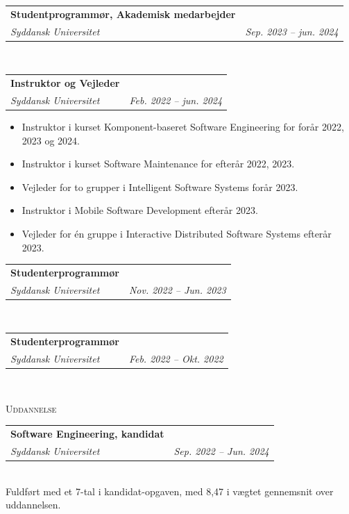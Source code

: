 \documentclass[11pt]{article}
\makeatletter
\newcommand{\resumeSubheading}[4]{
  \noindent\begin{tabular*}{0.98\textwidth}[t]{l@{\extracolsep{\fill}}r}
    \noindent \textbf{#3} & \textit{\small #2} \\ \vspace{-3pt} 
    \noindent \textit{\small #1} & \textit{\small #4} 
  \end{tabular*}\vspace{7pt}
}
\makeatother
\begin{document}
\resumeSubheading{Syddansk Universitet}{}{Studentprogrammør, Akademisk
medarbejder}{Sep. 2023 -- jun. 2024}\\

\vspace{0.3cm}
\resumeSubheading{Syddansk Universitet}{}{Instruktor og Vejleder}{Feb. 2022 -- jun. 2024}
\vspace{-0.2cm}
\begin{itemize}[itemsep=0pt]
  \small
  \item Instruktor i kurset Komponent-baseret Software Engineering for forår 2022, 2023 og 2024.
  \item Instruktor i kurset Software Maintenance for efterår 2022, 2023. 
  \item Vejleder for to grupper i Intelligent Software Systems forår 2023. 
  \item Instruktor i Mobile Software Development efterår 2023.  
  \item Vejleder for én gruppe i Interactive Distributed Software Systems efterår 2023.
\end{itemize}


\vspace{0.3cm}
\resumeSubheading{Syddansk Universitet}{}{Studenterprogrammør}{Nov. 2022 -- Jun. 2023}\\

\vspace{0.3cm}
\resumeSubheading{Syddansk Universitet}{}{Studenterprogrammør}{Feb. 2022 -- Okt. 2022}\\
\vspace{0.3cm}

\newpage
\noindent\large{\scshape{Uddannelse}} \newline
\noindent{\rule[0.3cm]{\textwidth}{0.4pt}}

\resumeSubheading{Syddansk Universitet}{}{Software Engineering, kandidat}{Sep.
2022 -- Jun. 2024}\\\vspace{0.25cm}
  \vspace{-0.3cm}
  {\indent\small Fuldført med et 7-tal i kandidat-opgaven, med 8,47 i vægtet
  gennemsnit over uddannelsen.}
\end{document}

